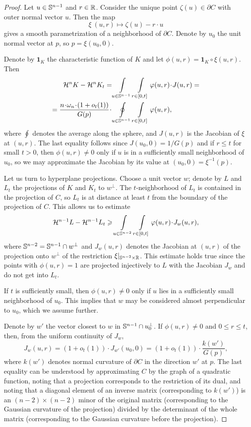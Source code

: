 \documentclass[a4paper,10pt]{article}
\begin{document}
\begin{proof}
Let $u\in \mathbb{S}^{n-1}$ and $r\in \mathbb{R}$.
Consider the unique point $\zeta(u)\in \partial C$ with outer normal vector $u$.
Then the map
\[
\xi\:(u,r)\mapsto\zeta(u)-r\cdot u
\]
gives a smooth parametrization of a neighborhood of $\partial C$.
Denote by $u_0$ the unit normal vector at $p$, so $p=\xi(u_0,0)$.

Denote by $\mathbf 1_K$ the characteristic function of $K$ and let $\phi(u,r)=\mathbf 1_K\circ \xi(u,r)$.
Then
\begin{align*}
\mathcal H^n K-\mathcal H^n K_t
=
&\int\limits_{u\in \SSS^{n-1}}
\int\limits_{r\in [0,t]} \phi(u,r)\cdot J(u,r)=
\\
=
\frac{n\cdot \omega_n\cdot (1+o_t(1))}{G(p)}
\cdot
&\oint\limits_{u\in \SSS^{n-1}}
\int\limits_{r\in [0,t]} \phi(u,r),
\end{align*}
where $\oint$ denotes the average along the sphere, and $J(u,r)$ is the Jacobian of $\xi$ at $(u,r)$.
The last equality follows since $J(u_0,0)=1/G(p)$ and if $r\le t$ for small $t>0$, then $\phi(u,r)\ne 0$ only if $u$ is in a sufficiently small neighborhood of $u_0$, so we may approximate the Jacobian by its value at $(u_0,0)=\xi^{-1}(p)$.

Let us turn to hyperplane projections.
Choose a unit vector $w$; denote by $L$ and $L_t$ the projections of $K$ and $K_t$ to $w^\perp$.
The $t$-neighborhood of $L_t$ is contained in the projection of $C$, so $L_t$ is at distance at least $t$ from the boundary of the projection of $C$.
This allows us to estimate
\[
\mathcal H^{n-1} L-\mathcal H^{n-1} L_t
\ge
\int\limits_{u\in \SSS^{n-2}}
\int\limits_{r\in [0,t]}
\phi(u,r)\cdot J_w(u,r),
\]
where $\mathbb{S}^{n-2}=\mathbb{S}^{n-1}\cap w^\perp$ and
$J_w(u,r)$ denotes the Jacobian at $(u,r)$ of the projection onto $w^\perp$ of the restriction $\xi|_{\mathbb{S}^{n-2}\times \mathbb{R}}$.
This estimate holds true since the points with $\phi(u,r)=1$ are projected injectively to $L$ with the Jacobian $J_w$ and do not get into $L_t$.

If $t$ is sufficiently small, then $\phi(u,r)\ne 0$ only if $u$ lies in a sufficiently small neighborhood of $u_0$.
This implies that $w$ may be considered almost perpendicular to $u_0$, which we assume further.

Denote by $w'$ the vector closest to $w$ in $\mathbb{S}^{n-1}\cap u_0^\perp$.
If $\phi(u,r)\ne 0$ and $0\le r\le t$, then, from the uniform continuity of $J_w$,
\[
J_w(u,r)=(1+o_t(1))\cdot J_{w'}(u_0,0)=(1+o_t(1))\cdot \frac{k(w')}{G(p)},
\]
where $k(w')$ denotes normal curvature of $\partial C$ in the direction $w'$ at $p$.
The last equality can be understood by approximating $C$ by the graph of a quadratic function, noting that a projection corresponds to the restriction of its dual, and noting that a diagonal element of an inverse matrix (corresponding to $k(w')$) is an $(n-2)\times (n-2)$ minor of the original matrix (corresponding to the Gaussian curvature of the projection) divided by the determinant of the whole matrix (corresponding to the Gaussian curvature before the projection).


\end{proof}
\end{document}
